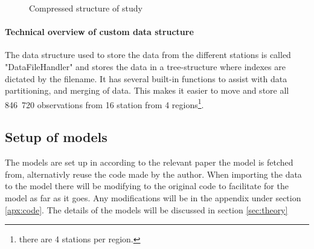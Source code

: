 \begin{figure}[h]
	\caption{Compressed structure of study}
\end{figure}

\paragraph{Technical overview of custom data structure}

The data structure used to store the data from the different stations is called "DataFileHandler" and stores the data in a tree-structure where indexes are dictated by the filename. It has several built-in functions to assist with data partitioning, and merging of data. This makes it easier to move and store all 846 720 observations from 16 station from 4 regions\footnote{there are 4 stations per region.}. 

\subsection{Setup of models}

The models are set up in according to the relevant paper the model is fetched from, alternativly reuse the code made by the author. When importing the data to the model there will be modifying to the original code to facilitate for the model as far as it goes. Any modifications will be in the appendix under section \ref{apx:code}. The details of the models will be discussed in section \ref{sec:theory}